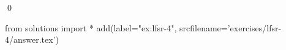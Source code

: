 
\begin{ex} 
  \label{ex:lfsr-4}
  
  \qed
\end{ex} 
\begin{python0}
from solutions import *
add(label="ex:lfsr-4",
    srcfilename='exercises/lfsr-4/answer.tex') 
\end{python0}
